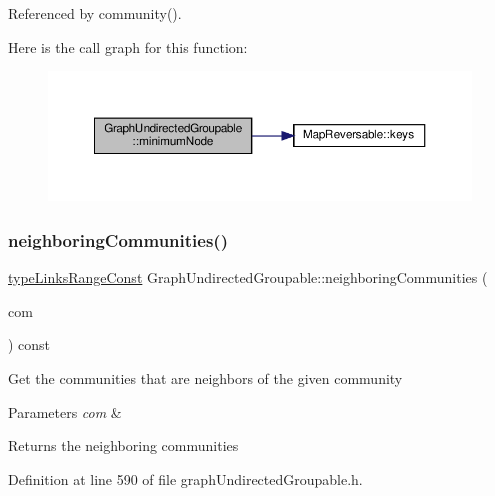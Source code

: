Referenced by community().

Here is the call graph for this function\+:\nopagebreak
\begin{figure}[H]
\begin{center}
\leavevmode
\includegraphics[width=350pt]{classGraphUndirectedGroupable_a0ce165b4c68150f60ccd1977b83f3eb3_cgraph}
\end{center}
\end{figure}
\mbox{\label{classGraphUndirectedGroupable_a248d992baca0755467a2eaea96fe3654}} 
\subsubsection{\texorpdfstring{neighboring\+Communities()}{neighboringCommunities()}}
{\footnotesize\ttfamily \hyperlink{graphInterface_8h_ae8d27008f15586bbf419af7ad2e0a48a}{type\+Links\+Range\+Const} Graph\+Undirected\+Groupable\+::neighboring\+Communities (\begin{DoxyParamCaption}\item[{const \hyperlink{graphUndirectedGroupable_8h_a914da95c9ea7f14f4b7f875c36818556}{type\+Community} \&}]{com }\end{DoxyParamCaption}) const\hspace{0.3cm}{\ttfamily [inline]}}

Get the communities that are neighbors of the given community


\begin{DoxyParams}{Parameters}
{\em com} & \\
\hline
\end{DoxyParams}
\begin{DoxyReturn}{Returns}
the neighboring communities 
\end{DoxyReturn}


Definition at line 590 of file graph\+Undirected\+Groupable.\+h.



